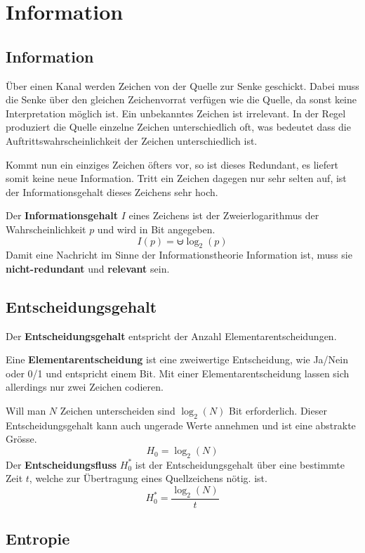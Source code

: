 \section{Information}

\subsection{Information}
 
Über einen Kanal werden Zeichen von der Quelle zur Senke geschickt. Dabei muss
die Senke über den gleichen Zeichenvorrat verfügen wie die Quelle, da sonst
keine Interpretation möglich ist. Ein unbekanntes Zeichen ist irrelevant. In der
Regel produziert die Quelle einzelne Zeichen unterschiedlich oft, was bedeutet
dass die Auftrittswahrscheinlichkeit der Zeichen unterschiedlich ist. 

Kommt nun ein einziges Zeichen öfters vor, so ist dieses Redundant, es liefert
somit keine neue Information. Tritt ein Zeichen dagegen nur sehr selten auf, ist
der Informationsgehalt dieses Zeichens sehr hoch. 

Der \textbf{Informationsgehalt} $I$ eines Zeichens ist der Zweierlogarithmus der
Wahrscheinlichkeit $p$ und wird in Bit angegeben.
\[
	I(p) = \uminus \log_2(p)
\]
Damit eine Nachricht im Sinne der Informationstheorie Information ist, muss sie
\textbf{nicht-redundant} und \textbf{relevant} sein.


\subsection{Entscheidungsgehalt}

Der \textbf{Entscheidungsgehalt} entspricht der Anzahl Elementarentscheidungen.

Eine \textbf{Elementarentscheidung} ist eine zweiwertige Entscheidung, wie
Ja/Nein oder 0/1 und entspricht einem Bit. Mit einer Elementarentscheidung
lassen sich allerdings nur zwei Zeichen codieren. 

Will man $N$ Zeichen unterscheiden sind $\log_2(N)$ Bit erforderlich. Dieser
Entscheidungsgehalt kann auch ungerade Werte annehmen und ist eine abstrakte
Grösse.
\[
	H_0=\log_2(N)
\]
Der \textbf{Entscheidungsfluss} $H^*_0$ ist der Entscheidungsgehalt über eine
bestimmte Zeit $t$, welche zur Übertragung eines Quellzeichens nötig. ist.
\[
	H^*_0=\frac{\log_2(N)}{t}
\]


\subsection{Entropie}


